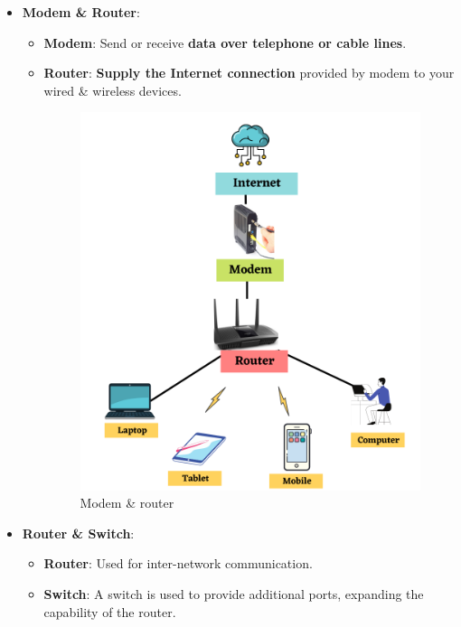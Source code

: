 \setlength{\columnsep}{3pt}
\begin{flushleft}
	\begin{itemize}
		\item \textbf{Modem \& Router}: 
		\begin{itemize}
			\item \textbf{Modem}: Send or receive \textbf{data over telephone or cable lines}.
			\item \textbf{Router}: \textbf{Supply the Internet connection} provided by modem to your wired \& wireless devices.
			\begin{figure}[h!]
				\centering
				\includegraphics[scale=0.6]{content/chapter14/images/modem_internet.png}
				\caption{Modem \& router}
				\label{fig:modem_router}
			\end{figure}
		\end{itemize}
	\newpage
		\item \textbf{Router \& Switch}: 
		\begin{itemize}
			\item \textbf{Router}: Used for inter-network communication.
			\item \textbf{Switch}: A switch is used to provide additional ports, expanding the capability of the router.

\end{itemize}
\end{itemize}
\end{flushleft}
